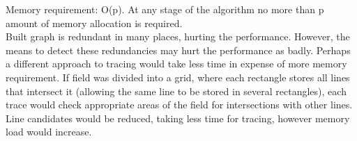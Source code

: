 \documentclass[a4paper,12pt]{article}
\begin{document}
Memory requirement: O(p). At any stage of the algorithm no more than p amount of memory allocation is required.\\
Built graph is redundant in many places, hurting the performance. However, the means to detect these redundancies may hurt the performance as badly. Perhaps a different approach to tracing would take less time in expense of more memory requirement. If field was divided into a grid, where each rectangle stores all lines that intersect it (allowing the same line to be stored in several rectangles), each trace would check appropriate areas of the field for intersections with other lines. Line candidates would be reduced, taking less time for tracing, however memory load would increase.
\end{document}
